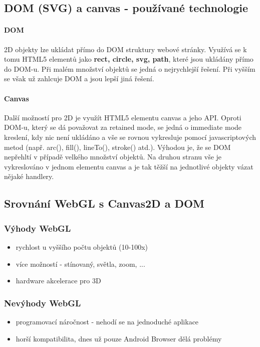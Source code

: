 \documentclass[12pt,a4paper,titlepage,final]{report}
\begin{document}
\subsection{DOM (SVG) a canvas - používané technologie}

\paragraph{DOM} 2D objekty lze ukládat přímo do DOM struktury webové stránky. Využívá se k tomu HTML5 elementů jako \textbf{rect, circle, svg, path}, které jsou ukládány přímo do DOM-u. Při malém množství objektů se jedná o nejrychlejší řešení. Při vyšším se však už zahlcuje DOM a jsou lepší jiná řešení.

\paragraph{Canvas} Další možností pro 2D je využít HTML5 elementu canvas a jeho API. Oproti DOM-u, který se dá považovat za retained mode, se jedná o immediate mode kreslení, kdy nic není ukládáno a vše se rovnou vykresluje pomocí javascriptových metod (např. arc(), fill(), lineTo(),  stroke() atd.). Výhodou je, že se DOM nepřehltí v případě velkého množství objektů. Na druhou stranu vše je vykreslováno v jednom elementu canvas a je tak těžší na jednotlivé objekty vázat nějaké handlery.

\subsection{Srovnání WebGL s Canvas2D a DOM}


\subsubsection{Výhody WebGL}
\begin{itemize}
	\item rychlost u vyššího počtu objektů (10-100x)
	\item více možností - stínovaný, světla, zoom, ...	
	\item hardware akcelerace pro 3D
\end{itemize}
\subsubsection{Nevýhody WebGL}
\begin{itemize}
	\item programovací náročnost - nehodí se na jednoduché aplikace
	\item horší kompatibilita, dnes už pouze Android Browser dělá problémy
\end{itemize}
\end{document}
